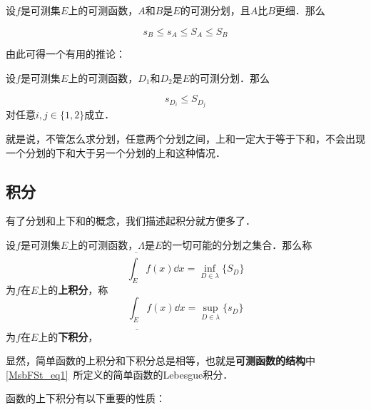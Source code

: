 \begin{lemma}{}\label{Lebes1_lem1}

设$f$是可测集$E$上的可测函数，$A$和$B$是$E$的可测分划，且$A$比$B$更细．那么

\begin{equation}
s_B\leq s_A\leq S_A\leq S_B
\end{equation}


\end{lemma}

由此可得一个有用的推论：

\begin{corollary}{}
设$f$是可测集$E$上的可测函数，$D_1$和$D_2$是$E$的可测分划．那么

\begin{equation}
s_{D_i}\leq S_{D_j}
\end{equation}
对任意$i, j\in\{1, 2\}$成立．

\end{corollary}

就是说，不管怎么求分划，任意两个分划之间，上和一定大于等于下和，不会出现一个分划的下和大于另一个分划的上和这种情况．






\subsection{积分}

有了分划和上下和的概念，我们描述起积分就方便多了．

\begin{definition}{}

设$f$是可测集$E$上的可测函数，$\Lambda$是$E$的一切可能的分划之集合．那么称
\begin{equation}
\overline{\int_E} f(x) \dd x=\inf_{D\in \lambda} \{S_D\}
\end{equation}
为$f$在$E$上的\textbf{上积分}，称
\begin{equation}
\underline{\int_E} f(x) \dd x=\sup_{D\in \lambda} \{s_D\}
\end{equation}
为$f$在$E$上的\textbf{下积分}，



\end{definition}

显然，简单函数的上积分和下积分总是相等，也就是\textbf{可测函数的结构}中\autoref{MsbFSt_eq1}~所定义的简单函数的Lebesgue积分．

函数的上下积分有以下重要的性质：

